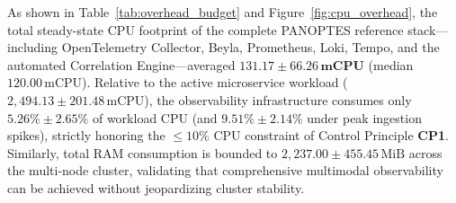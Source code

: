As shown in Table~\ref{tab:overhead_budget} and Figure~\ref{fig:cpu_overhead}, the total steady-state CPU footprint of the complete PANOPTES reference stack—including OpenTelemetry Collector, Beyla, Prometheus, Loki, Tempo, and the automated Correlation Engine—averaged $\mathbf{131.17 \pm 66.26\,\text{mCPU}}$ (median $120.00\,\text{mCPU}$). Relative to the active microservice workload ($2{,}494.13 \pm 201.48\,\text{mCPU}$), the observability infrastructure consumes only $\mathbf{5.26\% \pm 2.65\%}$ of workload CPU (and $9.51\% \pm 2.14\%$ under peak ingestion spikes), strictly honoring the $\le 10\%$ CPU constraint of Control Principle \textbf{CP1}. Similarly, total RAM consumption is bounded to $2{,}237.00 \pm 455.45\,\text{MiB}$ across the multi-node cluster, validating that comprehensive multimodal observability can be achieved without jeopardizing cluster stability.
